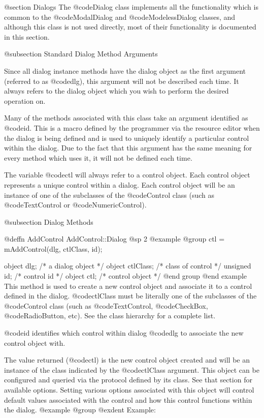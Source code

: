 @section Dialogs
The @code{Dialog} class implements all the functionality which is common
to the @code{ModalDialog} and @code{ModelessDialog} classes, and although
this class is not used directly, most of their functionality is documented
in this section.

@subsection  Standard Dialog Method Arguments

Since all dialog instance methods have the dialog object as the first
argument (referred to as @code{dlg}), this argument will not be described
each time.  It always refers to the dialog object which you wish to
perform the desired operation on.

Many of the methods associated with this class take an argument
identified as @code{id}.  This is a macro defined by the programmer via
the resource editor when the dialog is being defined and is used to
uniquely identify a particular control within the dialog.  Due to the
fact that this argument has the same meaning for every method which
uses it, it will not be defined each time.

The variable @code{ctl} will always refer to a control object.  Each
control object represents a unique control within a dialog.  Each
control object will be an instance of one of the subclasses of the
@code{Control} class (such as @code{TextControl} or
@code{NumericControl}).



@subsection Dialog Methods






@deffn {AddControl} AddControl::Dialog
@sp 2
@example
@group
ctl = mAddControl(dlg, ctlClass, id);

object  dlg;       /*  a dialog object   */
object  ctlClass;  /*  class of control  */
unsigned  id;      /*  control id        */
object  ctl;       /*  control object    */
@end group
@end example
This method is used to create a new control object and associate it to
a control defined in the dialog.  @code{ctlClass} must be literally
one of the subclasses of the @code{Control} class (such as
@code{TextControl}, @code{CheckBox}, @code{RadioButton}, etc).
See the class hierarchy for a complete list.

@code{id} identifies which control within dialog @code{dlg} to associate
the new control object with.

The value returned (@code{ctl}) is the new control object created and
will be an instance of the class indicated by the @code{ctlClass}
argument.  This object can be configured and queried via the protocol
defined by its class.  See that section for available options.  Setting
various options associated with this object will control default values
associated with the control and how this control functions within the
dialog.
@example
@group
@exdent Example:

